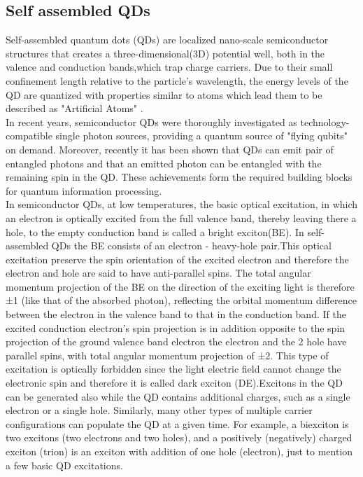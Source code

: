   	\subsection{Self assembled QDs}
	Self-assembled quantum dots (QDs) are localized nano-scale semiconductor structures that creates a three-dimensional(3D) potential well, both in the valence and conduction bands,which trap charge carriers. Due to their small confinement length relative to the particle's wavelength, the energy levels of the QD are quantized with properties similar to atoms which lead them to be described as "Artificial Atoms" \cite{Kastner1993} . \\
In recent years, semiconductor QDs were thoroughly investigated as technology-compatible single photon sources, providing a quantum source of "flying qubits" on demand.\cite{Dekel2000,Michler2000,Michler2000_1,Yuan2002} Moreover, recently it has been shown that QDs can emit pair of entangled photons \cite{Akopian2006,Hafenbrak2007} and that an emitted photon can be entangled with the remaining spin in the QD. \cite{Pelk2012,Schaibley2013,Gao2012} These achievements form the required building blocks for quantum information processing. \cite{DiVincenzo1998,Duan2001}\\
In semiconductor QDs, at low temperatures, the basic optical excitation, in which an electron is optically excited from the full valence band, thereby leaving there a hole, to the empty conduction band is called a bright exciton(BE). In self-assembled QDs the BE consists of an electron - heavy-hole pair.This optical excitation preserve the spin orientation of the excited electron and therefore the electron and hole are said to have anti-parallel spins. The total angular momentum projection of the BE on the direction of the exciting light is therefore ±1 (like that of the absorbed photon), reflecting the orbital momentum difference between the electron in the valence band to that in the conduction band.
If the excited conduction electron's spin projection is in addition opposite to the spin projection of the ground valence band electron the electron and the 2 hole have parallel spins, with total angular momentum projection of ±2. This type of excitation is optically forbidden since the light electric field cannot change the electronic spin and therefore it is called dark exciton (DE).Excitons in the QD can be generated also while the QD contains additional charges, such as a single electron or a single hole. Similarly, many other types of multiple carrier configurations can populate the QD at a given time. For example, a biexciton is two excitons (two electrons and two holes), and a positively (negatively) charged exciton (trion) is an exciton with addition of one hole (electron), just to mention a few basic QD excitations.

